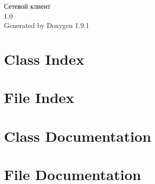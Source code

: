 \let\mypdfximage\pdfximage\def\pdfximage{\immediate\mypdfximage}\documentclass[twoside]{book}
\newcommand{\+}{\discretionary{\mbox{\scriptsize$\hookleftarrow$}}{}{}}
\newcommand{\clearemptydoublepage}{%
  \newpage{\pagestyle{empty}\cleardoublepage}%
}
\begin{document}
\raggedbottom

\hypersetup{pageanchor=false,
             bookmarksnumbered=true,
             pdfencoding=unicode
            }
\begin{titlepage}
\vspace*{7cm}
\begin{center}%
{\Large Сетевой клиент \\[1ex]\large 1.\+0 }\\
\vspace*{1cm}
{\large Generated by Doxygen 1.9.1}\\
\end{center}
\end{titlepage}
\clearemptydoublepage
{}
\tableofcontents
\clearemptydoublepage
{}
\hypersetup{pageanchor=true}

\chapter{Class Index}

\chapter{File Index}

\chapter{Class Documentation}





\chapter{File Documentation}










\backmatter
\newpage
{}
\clearemptydoublepage
{}
\printindex
\end{document}

